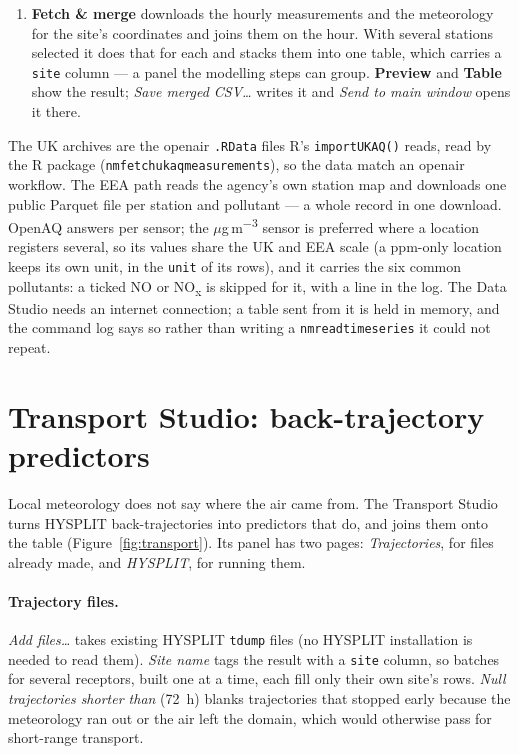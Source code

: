 \documentclass[11pt]{report}
\newcommand{\codeunderscore}{\textunderscore\allowbreak}
\newcommand{\code}[1]{\texttt{\let\_\codeunderscore #1}}
\newcommand{\tab}[1]{\textbf{#1}}
\newcommand{\ugm}{\ensuremath{\mu}g\,m\textsuperscript{$-3$}}
\begin{document}
\begin{enumerate}
        \code{ecmwfr::wf\_set\_key}). Open-Meteo adds \code{t2m},
        \code{d2m}, \code{rh2m}, \code{sp}, \code{tcc}, \code{tp}, \code{ssrd},
        \code{ws}, \code{wd}, \code{u10} and \code{v10} --- names the \emph{Columns} box
        recognises as meteorology. They come on UTC and are put on the window's clock
        (Section~\ref{sec:clock}) as they are joined.
  \item \textbf{Fetch \& merge} downloads the hourly measurements and the meteorology for
        the site's coordinates and joins them on the hour. With several stations
        selected it does that for each and stacks them into one table, which
        carries a \code{site} column --- a panel the modelling steps can group.
        \tab{Preview} and
        \tab{Table} show the result; \emph{Save merged CSV\ldots} writes it and
        \emph{Send to main window} opens it there.
\end{enumerate}
The UK archives are the openair \code{.RData} files R's \code{importUKAQ()} reads, read by
the R package (\code{nm\_fetch\_ukaq\_measurements}), so the data match an openair
workflow. The EEA path reads the agency's own station map and downloads one public Parquet
file per station and pollutant --- a whole record in one download. OpenAQ answers per
sensor; the \ugm{} sensor is preferred where a location registers several, so its values
share the UK and EEA scale (a ppm-only location keeps its own unit, in the \code{unit} of
its rows), and it carries the six common pollutants: a ticked NO or NO\textsubscript{x} is
skipped for it, with a line in the log. The Data Studio needs an internet connection; a
table sent from it is held in memory, and the command log says so rather than writing a
\code{nm\_read\_time\_series} it could not repeat.


\section{Transport Studio: back-trajectory predictors}\label{sec:transport}
Local meteorology does not say where the air came from. The Transport Studio turns
HYSPLIT back-trajectories into predictors that do, and joins them onto the table
(Figure~\ref{fig:transport}). Its panel has two pages: \emph{Trajectories}, for files
already made, and \emph{HYSPLIT}, for running them.

\paragraph{Trajectory files.} \emph{Add files\ldots} takes existing HYSPLIT
\code{tdump} files (no HYSPLIT installation is needed to read them). \emph{Site name}
tags the result with a \code{site} column, so batches for several receptors, built one
at a time, each fill only their own site's rows. \emph{Null trajectories shorter than}
(72~h) blanks trajectories that stopped early because the meteorology ran out or the air
left the domain, which would otherwise pass for short-range transport.
\end{document}
